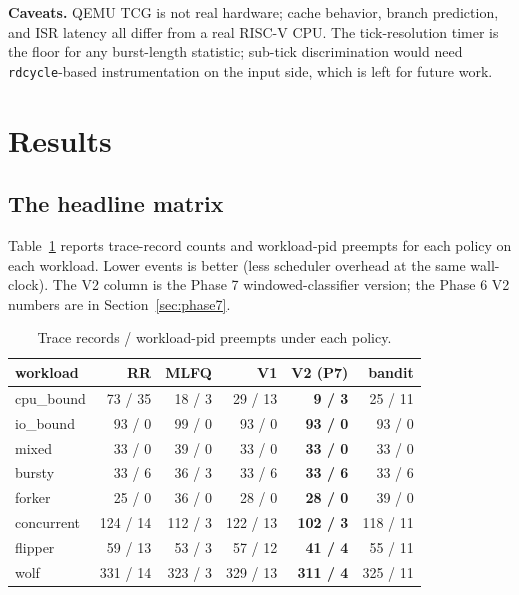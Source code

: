 \documentclass[11pt]{article}
\begin{document}
\textbf{Caveats.} QEMU TCG is not real hardware; cache behavior, branch
prediction, and ISR latency all differ from a real RISC-V CPU. The
tick-resolution timer is the floor for any burst-length statistic;
sub-tick discrimination would need \texttt{rdcycle}-based instrumentation on
the input side, which is left for future work.

\section{Results}
\label{sec:results}

\subsection*{The headline matrix}

Table~\ref{tab:headline} reports trace-record counts and workload-pid
preempts for each policy on each workload. Lower events is better (less
scheduler overhead at the same wall-clock). The V2 column is the Phase 7
windowed-classifier version; the Phase 6 V2 numbers are in
Section~\ref{sec:phase7}.

\begin{table}[h!]
\centering
\caption{Trace records / workload-pid preempts under each policy.}
\label{tab:headline}
\begin{tabular}{lrrrrr}
\toprule
workload    & RR        & MLFQ      & V1        & \textbf{V2 (P7)} & bandit  \\
\midrule
cpu\_bound  & 73 / 35   & 18 / 3    & 29 / 13   & \textbf{9 / 3}   & 25 / 11 \\
io\_bound   & 93 / 0    & 99 / 0    & 93 / 0    & \textbf{93 / 0}  & 93 / 0  \\
mixed       & 33 / 0    & 39 / 0    & 33 / 0    & \textbf{33 / 0}  & 33 / 0  \\
bursty      & 33 / 6    & 36 / 3    & 33 / 6    & \textbf{33 / 6}  & 33 / 6  \\
forker      & 25 / 0    & 36 / 0    & 28 / 0    & \textbf{28 / 0}  & 39 / 0  \\
concurrent  & 124 / 14  & 112 / 3   & 122 / 13  & \textbf{102 / 3} & 118 / 11\\
flipper     & 59 / 13   & 53 / 3    & 57 / 12   & \textbf{41 / 4}  & 55 / 11 \\
wolf        & 331 / 14  & 323 / 3   & 329 / 13  & \textbf{311 / 4} & 325 / 11\\
\bottomrule
\end{tabular}
\end{table}
\end{document}
